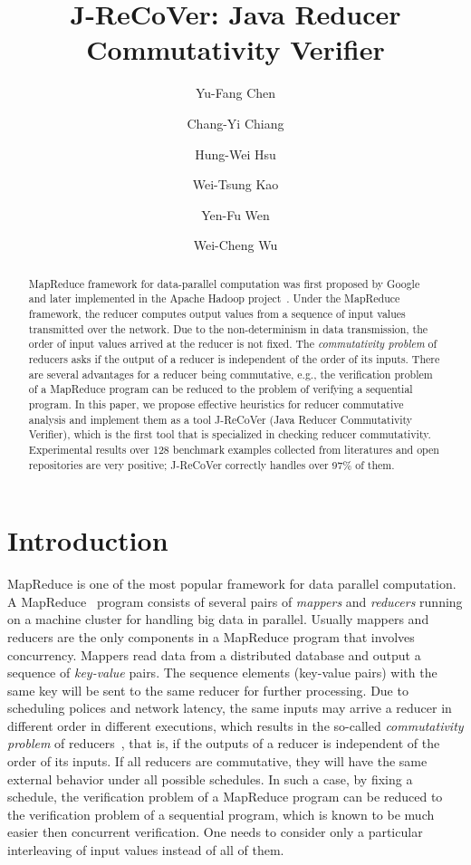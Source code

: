 \documentclass{llncs}
\title{J-ReCoVer: Java Reducer Commutativity Verifier}
\author{
Yu-Fang Chen\inst{1}\inst{2}
\and
Chang-Yi Chiang\inst{2}
\and
Hung-Wei Hsu\inst{1}
\and
Wei-Tsung Kao\inst{1}
\and
Yen-Fu Wen\inst{2}
\and
Wei-Cheng Wu\inst{1}
}
\institute
{
Institute of Information Science, Academia Sinica, Taiwan
\and
Graduate Institute of Information Management, National Taipei University, Taiwan
}
\begin{document}
\maketitle

\begin{abstract}
	
MapReduce framework for data-parallel computation was first proposed by Google~\cite{dean04} and later implemented in the Apache Hadoop project~\cite{hadoop}.
Under the MapReduce framework, the reducer computes output values from a sequence of input values transmitted over the network.  Due to the non-determinism in data transmission, the order of input values arrived at the reducer is not fixed.
The \emph{commutativity problem} of reducers asks if the output of a reducer is independent of the order of its inputs. There are several advantages for a reducer being commutative, e.g., the verification problem of a MapReduce program can be reduced to the problem of verifying a sequential program. 
In this paper, we propose effective heuristics for reducer commutative analysis and implement them as a tool J-ReCoVer (Java Reducer Commutativity Verifier), which is the first tool that is specialized in checking reducer commutativity. Experimental results over 128 benchmark examples collected from literatures and open repositories are very positive; J-ReCoVer correctly handles over 97\% of them.


\end{abstract}

\section{Introduction}
\label{section:introduction}

MapReduce is one of the most popular framework for data parallel computation.
A MapReduce~\cite{dean04,hadoop} program consists of several pairs of \emph{mappers} and \emph{reducers} running on a machine cluster for handling big data in parallel. Usually mappers and reducers are the only components in a MapReduce program that involves concurrency. Mappers read data from a distributed database and output a sequence of \emph{key-value} pairs. The sequence elements (key-value pairs) with the same key will be sent to the same reducer for further processing. Due to scheduling polices and network latency, the same inputs may arrive a reducer in different order in different executions, which results in the so-called \emph{commutativity problem} of reducers~\cite{csallner13testing,xiao14mr,ChenHSW15,ChenSW16}, that is, if the outputs of a reducer is independent of the order of its inputs. 
If all reducers are commutative, they will have the same external behavior under all possible schedules. In such a case, by fixing a schedule, the verification problem of a MapReduce program can be reduced to the verification problem of a sequential program, which is known to be much easier then concurrent verification. One needs to consider only a particular interleaving of input values instead of all of them.
\end{document}
